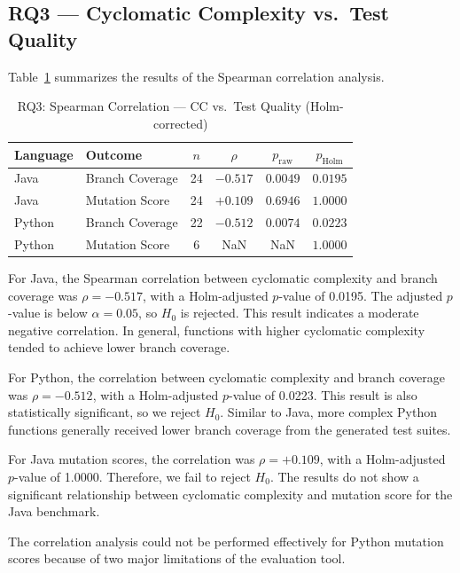 \documentclass[conference]{IEEEtran}
\begin{document}
\subsection{RQ3 --- Cyclomatic Complexity vs.\ Test Quality}
\label{subsec:rq3}

Table~\ref{tab:rq3} summarizes the results of the Spearman correlation analysis.

\begin{table}[ht]
\centering
\caption{RQ3: Spearman Correlation --- CC vs.\ Test Quality (Holm-corrected)}
\label{tab:rq3}
\begin{tabular}{llcccc}
\toprule
Language & Outcome & $n$ & $\rho$ & $p_{\text{raw}}$ & $p_{\text{Holm}}$ \\
\midrule
Java   & Branch Coverage & 24 & $-0.517$ & $0.0049$ & $0.0195$ \\
Java   & Mutation Score  & 24 & $+0.109$ & $0.6946$  & $1.0000$  \\
Python & Branch Coverage & 22 & $-0.512$ & $0.0074$ & $0.0223$ \\
Python & Mutation Score  & 6  & NaN      & NaN      & $1.0000$ \\
\bottomrule
\end{tabular}
\end{table}

For Java, the Spearman correlation between cyclomatic complexity and branch coverage was $\rho = -0.517$, with a Holm-adjusted $p$-value of 0.0195. The adjusted $p$-value is below $\alpha = 0.05$, so $H_0$ is rejected. This result indicates a moderate negative correlation. In general, functions with higher cyclomatic complexity tended to achieve lower branch coverage.

For Python, the correlation between cyclomatic complexity and branch coverage was $\rho = -0.512$, with a Holm-adjusted $p$-value of 0.0223. This result is also statistically significant, so we reject $H_0$. Similar to Java, more complex Python functions generally received lower branch coverage from the generated test suites.

For Java mutation scores, the correlation was $\rho = +0.109$, with a Holm-adjusted $p$-value of 1.0000. Therefore, we fail to reject $H_0$. The results do not show a significant relationship between cyclomatic complexity and mutation score for the Java benchmark.

The correlation analysis could not be performed effectively for Python mutation scores because of two major limitations of the evaluation tool.
\end{document}
